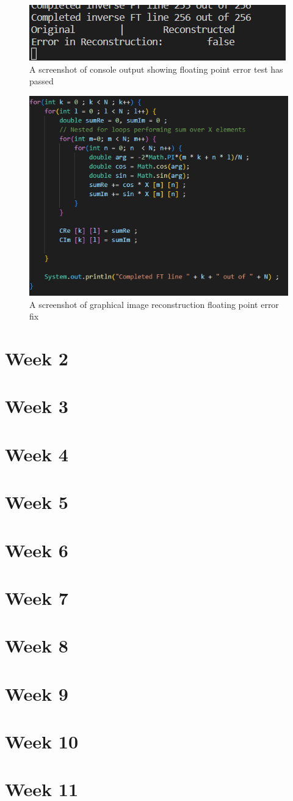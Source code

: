     \begin{figure}[H]
        \centering
        \includegraphics[width=0.49\columnwidth]{Figures/Week 1/W1-SimpleFT-InverseDFT-Test-2.0-CLI-Output.png}
        \caption{A screenshot of console output showing floating point error test has passed}
        \label{fig:floating-Point-Fixed-CLI-Output}
    \end{figure}
    
    \begin{figure}[H]
        \centering
        \includegraphics[width=0.49\columnwidth]{Figures/Week 1/W1-SimpleFT-Completed-For-Loop.png}
        \caption{A screenshot of graphical image reconstruction floating point error fix}
        \label{fig:floating-Point-Fixed-Graphical-Output}
    \end{figure}

    
\subsection{}

\section{Week 2}
\section{Week 3}
\section{Week 4}
\section{Week 5}
\section{Week 6}
\section{Week 7}
\section{Week 8}
\section{Week 9}
\section{Week 10}
\section{Week 11}
